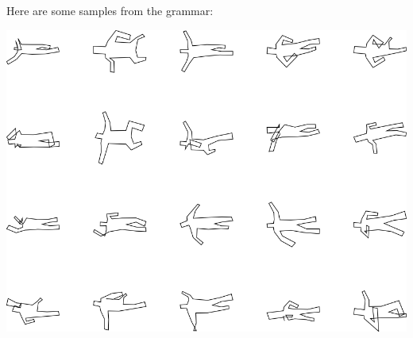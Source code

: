 Here are some samples from the grammar:

\includegraphics[width=6in]{output/3.learning/sdf_tuning/gram.10.d/samples.png}

